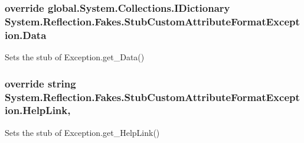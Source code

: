 \hypertarget{class_system_1_1_reflection_1_1_fakes_1_1_stub_custom_attribute_format_exception_ab1484aca951a9569544bc5b53cc092d9}{
\subsubsection[{Data}]{\setlength{\rightskip}{0pt plus 5cm}override global.\-System.\-Collections.\-I\-Dictionary System.\-Reflection.\-Fakes.\-Stub\-Custom\-Attribute\-Format\-Exception.\-Data\hspace{0.3cm}{\ttfamily [get]}}}\label{class_system_1_1_reflection_1_1_fakes_1_1_stub_custom_attribute_format_exception_ab1484aca951a9569544bc5b53cc092d9}


Sets the stub of Exception.\-get\-\_\-\-Data()

\hypertarget{class_system_1_1_reflection_1_1_fakes_1_1_stub_custom_attribute_format_exception_a951a8cfba8cb7a65a3e2319c57928692}{
\subsubsection[{Help\-Link}]{\setlength{\rightskip}{0pt plus 5cm}override string System.\-Reflection.\-Fakes.\-Stub\-Custom\-Attribute\-Format\-Exception.\-Help\-Link\hspace{0.3cm}{\ttfamily [get]}, {\ttfamily [set]}}}\label{class_system_1_1_reflection_1_1_fakes_1_1_stub_custom_attribute_format_exception_a951a8cfba8cb7a65a3e2319c57928692}


Sets the stub of Exception.\-get\-\_\-\-Help\-Link()

